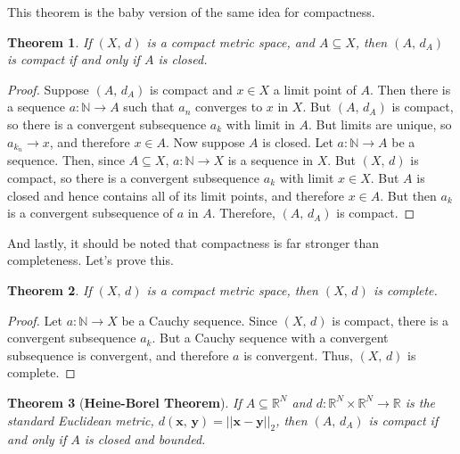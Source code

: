 \documentclass{article}
\theoremstyle{plain}
\newtheorem{theorem}{Theorem}[section]
\begin{document}
        This theorem is the baby version of the same idea for compactness.
        \begin{theorem}
            If $(X,\,d)$ is a compact metric space, and $A\subseteq{X}$, then
            $(A,\,d_{A})$ is compact if and only if $A$ is closed.
        \end{theorem}
        \begin{proof}
            Suppose $(A,\,d_{A})$ is compact and $x\in{X}$ a limit point of
            $A$. Then there is a sequence $a:\mathbb{N}\rightarrow{A}$ such
            that $a_{n}$ converges to $x$ in $X$. But $(A,\,d_{A})$ is compact,
            so there is a convergent subsequence $a_{k}$ with limit in $A$.
            But limits are unique, so $a_{k_{n}}\rightarrow{x}$, and therefore
            $x\in{A}$. Now suppose $A$ is closed. Let
            $a:\mathbb{N}\rightarrow{A}$ be a sequence. Then, since
            $A\subseteq{X}$, $a:\mathbb{N}\rightarrow{X}$ is a sequence in $X$.
            But $(X,\,d)$ is compact, so there is a convergent subsequence
            $a_{k}$ with limit $x\in{X}$. But $A$ is closed and hence contains
            all of its limit points, and therefore $x\in{A}$. But then
            $a_{k}$ is a convergent subsequence of $a$ in $A$. Therefore,
            $(A,\,d_{A})$ is compact.
        \end{proof}
        And lastly, it should be noted that compactness is far stronger than
        completeness. Let's prove this.
        \begin{theorem}
            If $(X,\,d)$ is a compact metric space, then $(X,\,d)$ is complete.
        \end{theorem}
        \begin{proof}
            Let $a:\mathbb{N}\rightarrow{X}$ be a Cauchy sequence. Since
            $(X,\,d)$ is compact, there is a convergent subsequence
            $a_{k}$. But a Cauchy sequence with a convergent subsequence is
            convergent, and therefore $a$ is convergent. Thus, $(X,\,d)$ is
            complete.
        \end{proof}
        \begin{theorem}[\textbf{Heine-Borel Theorem}]
            If $A\subseteq\mathbb{R}^{N}$ and
            $d:\mathbb{R}^{N}\times\mathbb{R}^{N}\rightarrow\mathbb{R}$ is the
            standard Euclidean metric,
            $d(\mathbf{x},\,\mathbf{y})=||\mathbf{x}-\mathbf{y}||_{2}$, then
            $(A,\,d_{A})$ is compact if and only if $A$ is closed and bounded.
        \end{theorem}
\end{document}
